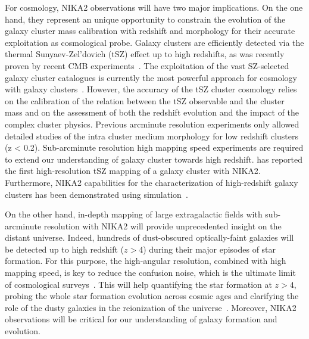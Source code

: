For cosmology, NIKA2 observations will have two major
implications. On the one hand, they represent an unique opportunity to
constrain the evolution of the galaxy cluster mass calibration with
redshift and morphology for their accurate exploitation as cosmological probe. 
Galaxy clusters are efficiently detected via the thermal
Sunyaev-Zel'dovich (tSZ) effect up to high redshifts, as was recently
proven by recent CMB
experiments~\citep{Hasselfield2013_ACT_SZ, Reichardt2013_SPT_SZ, Planck2016_SZcat}.
The exploitation of the vast SZ-selected galaxy cluster catalogues is
currently the most powerful approach for cosmology with galaxy
clusters~\citep{Planck_2016_SZ_cosmo}. However, the accuracy of the tSZ cluster
cosmology relies on the calibration of the relation between the tSZ
observable and the cluster mass and on the assessment of both the redshift
evolution and the impact of the complex cluster physics. 
Previous arcminute resolution experiments only allowed detailed studies
of the intra cluster medium morphology for low redshift clusters (z <
0.2). Sub-arcminute resolution high mapping speed experiments are
required to extend our understanding of galaxy cluster towards high
redshift. \citet{Ruppin2018} has reported the first high-resolution
tSZ mapping of a galaxy cluster with NIKA2. Furthermore, NIKA2
capabilities for the characterization of high-redshift galaxy clusters
has been demonstrated using simulation~\citep{Ruppin2019}.

On the other hand, in-depth mapping of large extragalactic fields with
sub-arcminute resolution with NIKA2 will provide unprecedented insight
on the distant universe. %
Indeed, hundreds of dust-obscured optically-faint galaxies will be
detected up to high redshift
($z>4$) during their major episodes of star formation. For this
purpose, the high-angular resolution, combined with high mapping
speed, is key to reduce the confusion noise, which is the ultimate
limit of cosmological surveys~\citep{Bethermin2017_simu}. 
This will help quantifying the star formation at $z>4$, probing the whole
star formation evolution across cosmic ages and clarifying the
role of the dusty galaxies in the reionization of the
universe~\citep{Mancuso2016}. Moreover, NIKA2 observations will be critical for our
understanding of galaxy formation and evolution.

